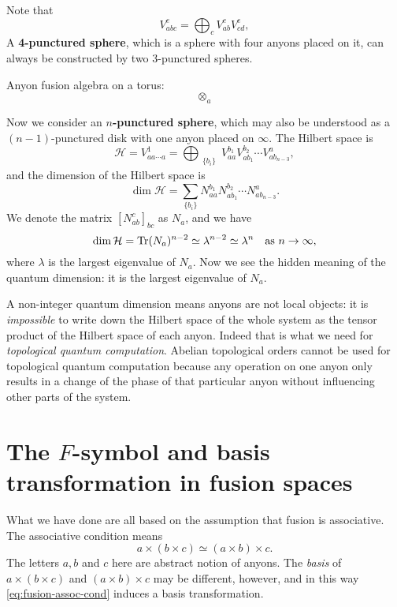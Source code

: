 \documentclass[hyperref, a4paper]{article}
\newcommand*{\concept}[1]{{\textbf{#1}}}
\begin{document}
Note that 
\begin{equation}
    V_{abc}^e = \bigoplus_{c} V_{ab}^c V_{cd}^e,
\end{equation}
A \concept{4-punctured sphere}, which is a sphere with four anyons placed on it, can always be constructed by two 3-punctured spheres.

Anyon fusion algebra on a torus: 
\begin{equation}
    \otimes_a 
\end{equation}

Now we consider an \concept{$n$-punctured sphere}, which may also be understood as a $(n-1)$-punctured disk with one anyon placed on $\infty$.
The Hilbert space is 
\begin{equation}
    \mathcal{H} = V_{a a \cdots a}^1 = \bigoplus_{\substack{\{b_i\}}} V_{aa}^{b_1} V_{a b_1}^{b_2} \cdots V_{a b_{n-3}}^a,
\end{equation}
and the dimension of the Hilbert space is 
\[
    \dim \mathcal{H} = \sum_{\{b_i\}} N_{aa}^{b_1} N_{a b_1}^{b_2} \cdots N_{a b_{n-3}}^a.
\]
We denote the matrix $[N_{ab}^c]_{bc}$ as $N_a$, and we have 
\[
    \dim \mathcal{H} = \Trace (N_a)^{n-2} \simeq \lambda^{n-2} \simeq \lambda^n \quad \text{as $n \to \infty$},
\]
where $\lambda$ is the largest eigenvalue of $N_a$.
Now we see the hidden meaning of the quantum dimension: it is the largest eigenvalue of $N_a$.

A non-integer quantum dimension means anyons are not local objects: it is \emph{impossible} to write down the Hilbert space of the whole system as the tensor product of the Hilbert space of each anyon.
Indeed that is what we need for \emph{topological quantum computation}.
Abelian topological orders cannot be used for topological quantum computation because any operation on one anyon only results in a change of the phase of that particular anyon without influencing other parts of the system.

\section{The $F$-symbol and basis transformation in fusion spaces}

What we have done are all based on the assumption that fusion is associative.
The associative condition means
\begin{equation}
    a \times (b \times c) \simeq (a \times b) \times c.
    \label{eq:fusion-assoc-cond}
\end{equation}
The letters $a, b$ and $c$ here are abstract notion of anyons.
The \emph{basis} of $a \times (b \times c)$ and $(a \times b) \times c$ may be different, however, and in this way \eqref{eq:fusion-assoc-cond} induces a basis transformation.
\end{document}
